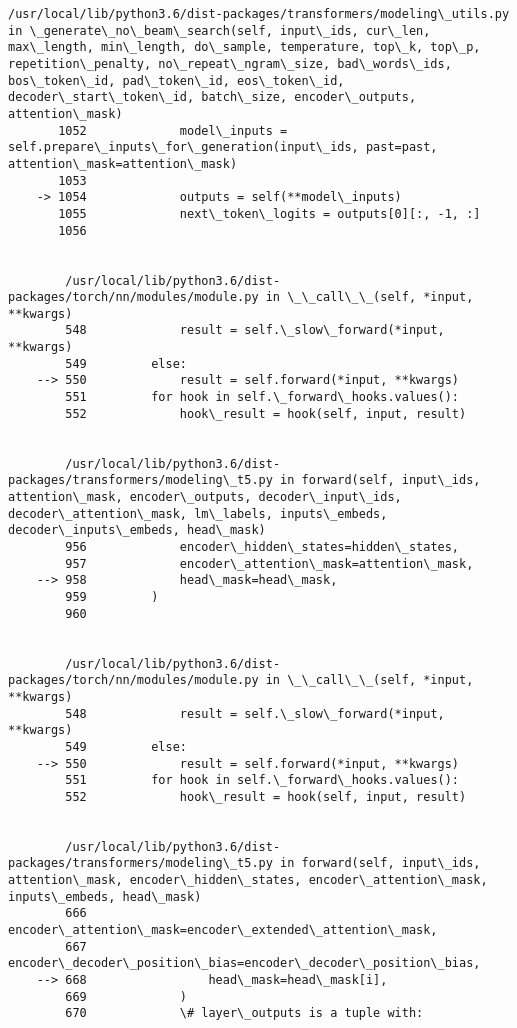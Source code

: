 \documentclass[10pt]{article}
\begin{document}
\begin{Verbatim}[commandchars=\\\{\}]
        /usr/local/lib/python3.6/dist-packages/transformers/modeling\_utils.py in \_generate\_no\_beam\_search(self, input\_ids, cur\_len, max\_length, min\_length, do\_sample, temperature, top\_k, top\_p, repetition\_penalty, no\_repeat\_ngram\_size, bad\_words\_ids, bos\_token\_id, pad\_token\_id, eos\_token\_id, decoder\_start\_token\_id, batch\_size, encoder\_outputs, attention\_mask)
       1052             model\_inputs = self.prepare\_inputs\_for\_generation(input\_ids, past=past, attention\_mask=attention\_mask)
       1053 
    -> 1054             outputs = self(**model\_inputs)
       1055             next\_token\_logits = outputs[0][:, -1, :]
       1056 


        /usr/local/lib/python3.6/dist-packages/torch/nn/modules/module.py in \_\_call\_\_(self, *input, **kwargs)
        548             result = self.\_slow\_forward(*input, **kwargs)
        549         else:
    --> 550             result = self.forward(*input, **kwargs)
        551         for hook in self.\_forward\_hooks.values():
        552             hook\_result = hook(self, input, result)


        /usr/local/lib/python3.6/dist-packages/transformers/modeling\_t5.py in forward(self, input\_ids, attention\_mask, encoder\_outputs, decoder\_input\_ids, decoder\_attention\_mask, lm\_labels, inputs\_embeds, decoder\_inputs\_embeds, head\_mask)
        956             encoder\_hidden\_states=hidden\_states,
        957             encoder\_attention\_mask=attention\_mask,
    --> 958             head\_mask=head\_mask,
        959         )
        960 


        /usr/local/lib/python3.6/dist-packages/torch/nn/modules/module.py in \_\_call\_\_(self, *input, **kwargs)
        548             result = self.\_slow\_forward(*input, **kwargs)
        549         else:
    --> 550             result = self.forward(*input, **kwargs)
        551         for hook in self.\_forward\_hooks.values():
        552             hook\_result = hook(self, input, result)


        /usr/local/lib/python3.6/dist-packages/transformers/modeling\_t5.py in forward(self, input\_ids, attention\_mask, encoder\_hidden\_states, encoder\_attention\_mask, inputs\_embeds, head\_mask)
        666                 encoder\_attention\_mask=encoder\_extended\_attention\_mask,
        667                 encoder\_decoder\_position\_bias=encoder\_decoder\_position\_bias,
    --> 668                 head\_mask=head\_mask[i],
        669             )
        670             \# layer\_outputs is a tuple with:



\end{Verbatim}
\end{document}
